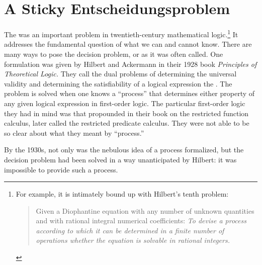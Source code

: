 \label{background:beginnings}
\section[A Sticky \foreign{Entscheidungsproblem}]{A Sticky Entscheidungsproblem}
The  %
was an important problem in twentieth-century mathematical logic.\footnote{For example, it is intimately bound up with Hilbert's tenth problem: 
\begin{quote}
Given a Diophantine equation with any number of unknown quantities and with rational integral numerical coefficients: \emph{To devise a process according to which it can be determined in a finite number of operations whether the equation is solvable in rational integers.}
\end{quote}
}
It addresses the fundamental question of what we can and cannot know. There are many ways to pose the decision problem, or  as it was often called. One formulation was given by Hilbert and Ackermann in their 1928 book \textit{Principles of Theoretical Logic.} They call the dual problems of determining the universal validity and determining the satisfiability of a logical expression the . The problem is solved when one knows a ``process'' that determines either property of any given logical expression in first-order logic. The particular first-order logic they had in mind was that propounded in their book on the restricted function calculus, later called the restricted predicate calculus.%
They were not able to be so clear about what they meant by ``process.''

By the 1930s, not only was the nebulous idea of a process formalized, but the decision problem had been solved in a way unanticipated by Hilbert: it was impossible to provide such a process.

